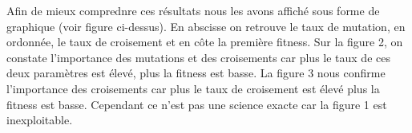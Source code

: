 \documentclass{article}
\begin{document}
\newline
Afin de mieux comprednre ces résultats nous les avons affiché sous forme de graphique (voir figure ci-dessus). En abscisse on retrouve le taux de mutation, en ordonnée, le taux de croisement et en côte la première fitness. Sur la figure 2, on constate l'importance des mutations et des croisements car plus le taux de ces deux paramètres est élevé, plus la fitness est basse. La figure 3 nous confirme l'importance des croisements car plus le taux de croisement est élevé plus la fitness est basse. Cependant ce n'est pas une science exacte car la figure 1 est inexploitable.
\end{document}
